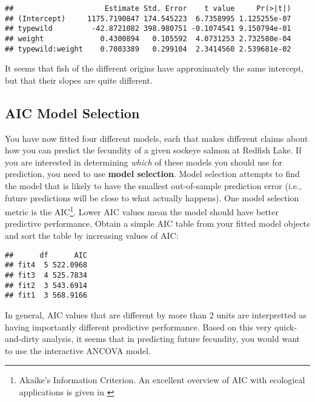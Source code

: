 \documentclass[]{book}
\newenvironment{Shaded}{\begin{snugshade}}{\end{snugshade}}
\newcommand{\KeywordTok}[1]{\textcolor[rgb]{0.13,0.29,0.53}{\textbf{#1}}}
\newcommand{\StringTok}[1]{\textcolor[rgb]{0.31,0.60,0.02}{#1}}
\newcommand{\OperatorTok}[1]{\textcolor[rgb]{0.81,0.36,0.00}{\textbf{#1}}}
\newcommand{\NormalTok}[1]{#1}
\let\rmarkdownfootnote\footnote%
\def\footnote{\protect\rmarkdownfootnote}
\theoremstyle{definition}
\theoremstyle{definition}
\theoremstyle{definition}
\theoremstyle{remark}
\begin{document}
\begin{verbatim}
##                     Estimate Std. Error    t value     Pr(>|t|)
## (Intercept)     1175.7190847 174.545223  6.7358995 1.125255e-07
## typewild         -42.8721082 398.980751 -0.1074541 9.150794e-01
## weight             0.4300894   0.105592  4.0731253 2.732580e-04
## typewild:weight    0.7003389   0.299104  2.3414560 2.539681e-02
\end{verbatim}

It seems that fish of the different origins have approximately the same
intercept, but that their slopes are quite different.

\subsection{AIC Model Selection}\label{aic-model-selection}

You have now fitted four different models, each that makes different
claims about how you can predict the fecundity of a given sockeye salmon
at Redfish Lake. If you are interested in determining \emph{which} of
these models you should use for prediction, you need to use
\textbf{model selection}. Model selection attempts to find the model
that is likely to have the smallest out-of-sample prediction error
(i.e., future predictions will be close to what actually happens). One
model selection metric is the AIC\footnote{Akaike's Information
  Criterion. An excellent overview of AIC with ecological applications
  is given in \citet{aic-cite}}. Lower AIC values mean the model should
have better predictive performance. Obtain a simple AIC table from your
fitted model objects and sort the table by increasing values of AIC:

\begin{Shaded}
\end{Shaded}

\begin{verbatim}
##      df      AIC
## fit4  5 522.0968
## fit3  4 525.7834
## fit2  3 543.6914
## fit1  3 568.9166
\end{verbatim}

In general, AIC values that are different by more than 2 units are
interpretted as having importantly different predictive performance.
Based on this very quick-and-dirty analysis, it seems that in predicting
future fecundity, you would want to use the interactive ANCOVA model.
\end{document}
